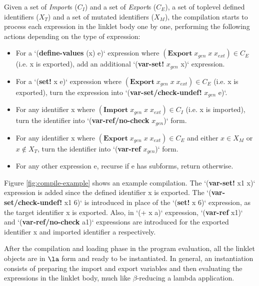 Given a set of \textit{Import}s ($\mathit{C_I}$) and a set of
\textit{Export}s ($\mathit{C_E}$), a set of toplevel defined
identifiers ($\mathit{X_T}$) and a set of mutated identifiers
($\mathit{X_M}$), the compilation starts to process each expression in
the linklet body one by one, performing the following actions
depending on the type of expression:

\begin{itemize}
 \item For a `(\textbf{define-values} (x) e)` expression where \newline
   $(\textbf{Export}\; x_{gen}\; x\; x_{ext}) \in \mathit{C_E}$ (i.e. x
   is exported), add an additional `(\textbf{var-set!} $x_{gen}$ x)`
   expression.
 \item For a `(\textbf{set!} x e)` expression where \newline
   $(\textbf{Export}\; x_{gen}\; x\; x_{ext}) \in \mathit{C_E}$ (i.e. x
   is exported), turn the expression into
   `(\textbf{var-set/check-undef!} $x_{gen}$ e)`.
 \item For any identifier x where $(\textbf{Import}\; x_{gen}\; x\;
   x_{ext}) \in \mathit{C_I}$ (i.e. x is imported), turn the identifier
   into \newline `(\textbf{var-ref/no-check} $x_{gen}$)` form.
  \item For any identifier x where $(\textbf{Export}\; x_{gen}\; x\; x_{ext}) \in
    \mathit{C_E}$ and either $x \in \mathit{X_M}$ or $x \notin \mathit{X_T}$,
    turn the identifier into `(\textbf{var-ref} $x_{gen}$)` form.
  \item For any other expression e, recurse if e has subforms, return
    otherwise.
\end{itemize}

\onecolumn

Figure \ref{fig:compile-example} shows an example compilation. The
`(\textbf{var-set!} x1 x)` expression is added since the defined
identifier x is exported. The `(\textbf{var-set/check-undef!} x1 6)`
is introduced in place of the `(\textbf{set!} x 6)` expression, as the
target identifier x is exported. Also, in `(+ x a)` expression,
`(\textbf{var-ref} x1)` and `(\textbf{var-ref/no-check} a1)`
expressions are introduced for the exported identifier x and imported
identifier a respectively.

After the compilation and loading phase in the program evaluation, all
the linklet objects are in $\la$ form and ready to be instantiated. In
general, an instantiation consists of preparing the import and export
variables and then evaluating the expressions in the linklet body,
much like $\beta$-reducing a lambda application.

